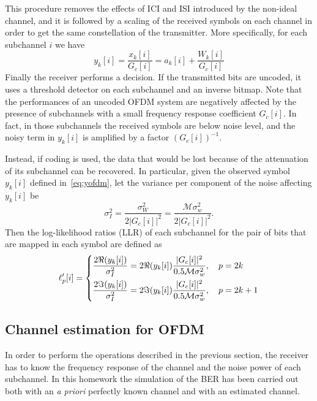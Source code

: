 \documentclass[10pt]{article}
\newcommand{\ofdM} {\mathcal{M}}
\begin{document}
This procedure removes the effects of ICI and ISI introduced by the non-ideal channel, and it is followed by a scaling of the received symbols on each channel in order to get the same constellation of the transmitter. More specifically, for each subchannel $i$ we have
\begin{equation}
	y_k[i] = \frac{x_k[i]}{G_c[i]} = a_k[i] + \frac{W_k[i]}{G_c[i]}
	\label{eq:yofdm}
\end{equation}
Finally the receiver performs a decision. If the transmitted bits are uncoded, it uses a threshold detector on each subchannel and an inverse bitmap. Note that the performances of an uncoded OFDM system are negatively affected by the presence of subchannels with a small frequency response coefficient $G_c[i]$. In fact, in those subchannels the received symbols are below noise level, and the noisy term in $y_k[i]$ is amplified by a factor $(G_c[i])^{-1}$.

Instead, if coding is used, the data that would be lost because of the attenuation of its subchannel can be recovered. In particular, given the observed symbol $y_k[i]$ defined in~\eqref{eq:yofdm}, let the variance per component of the noise affecting $y_k[i]$ be
\begin{equation}
	\sigma_I^2 = \frac{\sigma_W^2}{2 |G_c[i]|^2} = \frac{\ofdM \sigma_w^2}{2 |G_c[i]|^2}.
\end{equation}
Then the log-likelihood ratios (LLR) of each subchannel for the pair of bits that are mapped in each symbol are defined as
\begin{equation}
\ell'_p[i] =
	\begin{dcases}
	\frac{2\Re(y_k[i])}{\sigma_I^2} = 2\Re(y_k[i]) \frac{|G_c[i]|^2 }{0.5 \ofdM \sigma_w^2}, \quad p = 2k \\
	\frac{2\Im(y_k[i])}{\sigma_I^2} = 2\Im(y_k[i]) \frac{|G_c[i]|^2 }{0.5 \ofdM \sigma_w^2}, \quad p = 2k+1 \\
	\end{dcases}
\end{equation}

\subsection*{Channel estimation for OFDM}
In order to perform the operations described in the previous section, the receiver has to know the frequency response of the channel and the noise power of each subchannel. In this homework the simulation of the BER has been carried out both with an \textit{a priori} perfectly known channel and with an estimated channel. 
\end{document}
